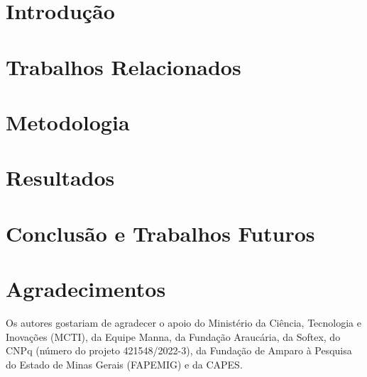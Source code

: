 \documentclass[12pt]{article}
\begin{document}
\section{Introdução}


\section{Trabalhos Relacionados} \label{sec:related_works}


\section{Metodologia} \label{sec:methods}


\section{Resultados} \label{sec:results}


\section{Conclusão e Trabalhos Futuros} \label{sec:conclusion}


\section*{Agradecimentos} 
Os autores gostariam de agradecer o apoio do Ministério da Ciência, Tecnologia e Inovações (MCTI), da Equipe Manna, da Fundação Araucária, da Softex, do CNPq (número do projeto 421548/2022-3), da Fundação de Amparo à Pesquisa do Estado de Minas Gerais (FAPEMIG) e da CAPES.




% 
\end{document}
